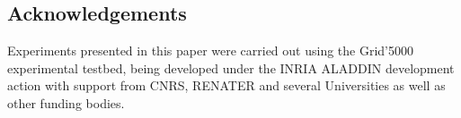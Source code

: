\documentclass[doublespacing]{bmcart}
\begin{document}
\begin{backmatter}



\section*{Acknowledgements}
Experiments presented in this paper were carried out using the Grid'5000
experimental testbed, being developed under the INRIA ALADDIN development action
with support from CNRS, RENATER and several Universities as well as other
funding bodies.




\end{backmatter}
\end{document}
